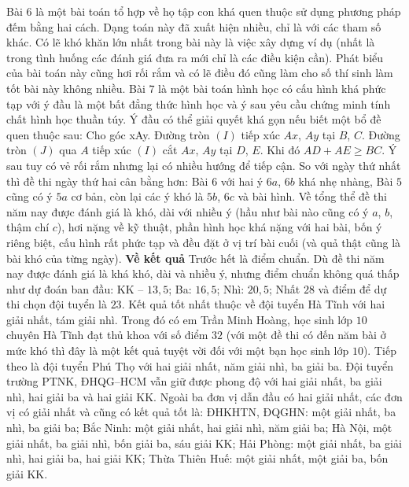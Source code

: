 \begin{multicols}{2}
	\vskip 0.05cm
	Bài $6$ là một bài toán tổ hợp về họ tập con khá quen thuộc sử dụng phương pháp đếm bằng hai cách. Dạng toán này đã xuất hiện nhiều, chỉ là với các tham số khác. Có lẽ khó khăn lớn nhất trong bài này là việc xây dựng ví dụ (nhất là trong tình huống các đánh giá đưa ra mới chỉ là các điều kiện cần). Phát biểu của bài toán này cũng hơi rối rắm và có lẽ điều đó cũng làm cho số thí sinh làm tốt bài này không nhiều.
	\vskip 0.05cm
	Bài $7$ là một bài toán hình học có cấu hình khá phức tạp với ý đầu là một bất đẳng thức hình học và ý sau yêu cầu chứng minh tính chất hình học thuần túy. Ý đầu có thể giải quyết khá gọn nếu biết một bổ đề quen thuộc sau: Cho góc xAy. Đường tròn $(I)$ tiếp xúc $Ax$, $Ay$ tại $B$, $C$. Đường tròn $(J)$ qua $A$ tiếp xúc $(I)$ cắt $Ax$, $Ay$ tại $D$, $E$. Khi đó $AD + AE \ge BC$. Ý sau tuy có vẻ rối rắm nhưng lại có nhiều hướng để tiếp cận.
	\vskip 0.05cm
	So với ngày thứ nhất thì đề thi ngày thứ hai cân bằng hơn: Bài $6$ với hai ý $6a$, $6b$ khá nhẹ nhàng, Bài $5$ cũng có ý $5a$ cơ bản, còn lại các ý khó là $5b$, $6c$ và bài hình. 
	\vskip 0.05cm
	Về tổng thể đề thi năm nay được đánh giá là khó, dài với nhiều ý (hầu như bài nào cũng có ý $a$, $b$, thậm chí $c$), hơi nặng về kỹ thuật, phần hình học khá nặng với hai bài, bốn ý riêng biệt, cấu hình rất phức tạp và đều đặt ở vị trí bài cuối (và quả thật cũng là bài khó của từng ngày).
	\vskip 0.05cm
	\textbf{\color{cackithi}Về kết quả}
	\vskip 0.05cm
	Trước hết là điểm chuẩn. Dù đề thi năm nay được đánh giá là khá khó, dài và nhiều ý, nhưng điểm chuẩn không quá thấp như dự đoán ban đầu: KK -- $13{,}5$; Ba: $16{,}5$; Nhì: $20{,}5$; Nhất $28$ và điểm để dự thi chọn đội tuyển là $23$. 
	\vskip 0.05cm
	Kết quả tốt nhất thuộc về đội tuyển Hà Tĩnh với hai giải nhất, tám giải nhì. Trong đó có em Trần Minh Hoàng, học sinh lớp $10$ chuyên Hà Tĩnh đạt thủ khoa với số điểm $32$ (với một đề thi có đến năm bài ở mức khó thì đây là một kết quả tuyệt vời đối với một bạn học sinh lớp $10$).
	\vskip 0.05cm
	Tiếp theo là đội tuyển Phú Thọ với hai giải nhất, năm giải nhì, ba giải ba. Đội tuyển trường PTNK, ĐHQG--HCM vẫn giữ được phong độ với hai giải nhất, ba giải nhì, hai giải ba và hai giải KK. 
	\vskip 0.05cm
	Ngoài ba đơn vị dẫn đầu có hai giải nhất, các đơn vị có giải nhất và cũng có kết quả tốt là: ĐHKHTN, ĐQGHN: một giải nhất, ba nhì, ba giải ba; Bắc Ninh: một giải nhất, hai giải nhì, năm giải ba; Hà Nội, một giải nhất, ba giải nhì, bốn giải ba, sáu giải KK; Hải Phòng: một giải nhất, ba giải nhì, hai giải ba, hai giải KK; Thừa Thiên Huế: một giải nhất, một giải ba, bốn giải KK.
	\vskip 0.05cm

\end{multicols}
